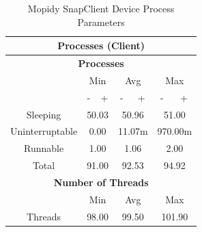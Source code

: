 \documentclass[11pt,a4paper]{scrreprt}
\begin{document}
\begin{table}[H]
\centering
    \begin{tabular}{||c|c|c|c|c|c|c||}
    \hline
    \multicolumn{7}{|c|}{\textbf{Processes (Client)}} \\
    \hline
    \multicolumn{7}{|c|}{\textbf{Processes}} \\
    \hline\hline
      & \multicolumn{2}{|c|}{Min} & \multicolumn{2}{|c|}{Avg} & \multicolumn{2}{|c|}{Max} \\
    \hline
      & - & + & - & + & - & + \\
    \hline
    Sleeping & \multicolumn{2}{|c|}{50.03} & \multicolumn{2}{|c|}{50.96} & \multicolumn{2}{|c|}{51.00} \\
    \hline
    Uninterruptable & \multicolumn{2}{|c|}{0.00} & \multicolumn{2}{|c|}{11.07m} & \multicolumn{2}{|c|}{970.00m} \\
    \hline
    Runnable & \multicolumn{2}{|c|}{1.00} & \multicolumn{2}{|c|}{1.06} & \multicolumn{2}{|c|}{2.00} \\
    \hline
    Total & \multicolumn{2}{|c|}{91.00} & \multicolumn{2}{|c|}{92.53} & \multicolumn{2}{|c|}{94.92} \\
    \hline\hline
    \multicolumn{7}{|c|}{\textbf{Number of Threads}} \\
    \hline\hline
      & \multicolumn{2}{|c|}{Min} & \multicolumn{2}{|c|}{Avg} & \multicolumn{2}{|c|}{Max} \\
    \hline
    Threads  & \multicolumn{2}{|c|}{98.00} & \multicolumn{2}{|c|}{99.50} & \multicolumn{2}{|c|}{101.90} \\
    \hline\hline
    \end{tabular}
    \caption{Mopidy SnapClient Device Process Parameters}
    \label{MopidyclientProcessTab}
\end{table}
\end{document}
